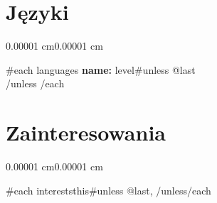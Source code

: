 \documentclass[10pt, letterpaper]{article}
\newenvironment{onecolentry}{
    \begin{adjustwidth}{0.00001 cm}{0.00001 cm}
}{
    \end{adjustwidth}
}
\begin{document}
\section{Języki}

\begin{onecolentry}
    {{#each languages}}
    \textbf{ {{name}}:} {{level}}{{#unless @last}} \\ {{/unless}}
    {{/each}}
\end{onecolentry}



\section{Zainteresowania}

\begin{onecolentry}
    {{#each interests}}{{this}}{{#unless @last}}, {{/unless}}{{/each}}
\end{onecolentry}
\end{document}
